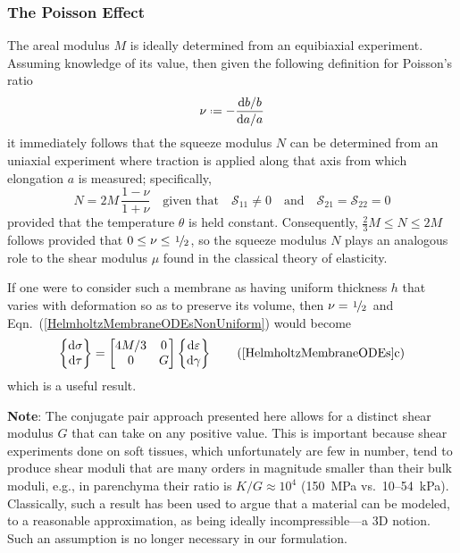 \subsubsection{The Poisson Effect}
\label{PoissonRatio}

The areal modulus $M$ is ideally determined from an equibiaxial experiment.  Assuming knowledge of its value, then given the following definition for Poisson's ratio
\begin{displaymath}
\nu \defeq - \frac{\mathrm{d}b / b}{\mathrm{d}a / a}
\end{displaymath}
it immediately follows that the squeeze modulus $N$ can be determined from an uniaxial experiment where traction is applied along that axis from which elongation $a$ is measured; specifically,
\begin{displaymath}
N = 2M \, \frac{1 - \nu}{1 + \nu} 
\quad \text{given that} \quad
\mathcal{S}_{11} \neq 0 
\quad \text{and} \quad
\mathcal{S}_{21} = \mathcal{S}_{22} = 0 
\end{displaymath}
provided that the temperature $\theta$ is held constant.  Consequently, $\tfrac{2}{3} M \leq N \leq 2M$ follows provided that $0 \leq \nu \leq \textfrac{1}{2}$, so the squeeze modulus $N$ plays an analogous role to the shear modulus $\mu$ found in the classical theory of elasticity.  

If one were to consider such a membrane as having uniform thickness $h$ that varies with deformation so as to preserve its volume, then $\nu = \textfrac{1}{2}$ and Eqn.~(\ref{HelmholtzMembraneODEsNonUniform}) would become
\begin{equation}
\left\{ \begin{matrix}
\mathrm{d} \sigma \\ \mathrm{d} \tau
\end{matrix} \right\} = \begin{bmatrix}
4 M / 3 & 0 \\
0 & G
\end{bmatrix} \left\{ \begin{matrix}
\mathrm{d} \varepsilon \\ \mathrm{d} \gamma
\end{matrix} \right\}
\label{HelmholtzMembraneODEsNonUniformCV}
    \tag{\ref{HelmholtzMembraneODEs}c}
\end{equation}
which is a useful result.

\medskip\noindent
\textbf{Note}: 
The conjugate pair approach presented here allows for a distinct shear modulus $G$ that can take on any positive value.  This is important because shear experiments done on soft tissues, which unfortunately are few in number, tend to produce shear moduli that are many orders in magnitude smaller than their bulk moduli, e.g., in parenchyma their ratio is $K/G \approx 10^{4}$ (150~MPa vs.\ 10--54~kPa).  \cite{Sarafetal07}  Classically, such a result has been used to argue that a material can be modeled, to a reasonable approximation, as being ideally incompressible---a 3D notion.  Such an assumption is no longer necessary in our formulation.

